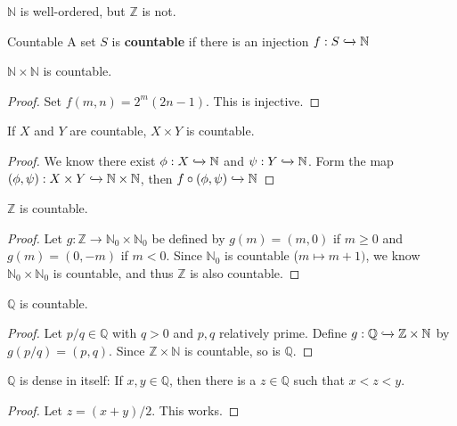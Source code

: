 \documentclass[10pt]{report}
\begin{document}
\begin{ex}{}{}
$\mathbb{N}$ is well-ordered, but $ \mathbb{Z}$ is not.
\end{ex}

\begin{defn}{Countable}{}
	A set $S$ is \textbf{countable} if there is an injection $f : S \xhookrightarrow{} \mathbb{N}$
\end{defn}

\begin{prop}
	$ \mathbb{N} \times \mathbb{N}$ is countable.
\end{prop}
\begin{proof}
	Set $f(m,n) = 2^m (2n-1)$. This is injective.
\end{proof}

\begin{cor}
	If $X$ and $Y$ are countable, $X \times Y$ is countable.
\end{cor}
\begin{proof}
	We know there exist $\phi: X \xhookrightarrow{} \mathbb{N}$ and $\psi: Y  \xhookrightarrow{} \mathbb{N}$. Form the map $(\phi, \psi) : X \times Y \xhookrightarrow{} \mathbb{N} \times \mathbb{N}$, then $f \circ (\phi, \psi)  \xhookrightarrow{} \mathbb{N}$	
\end{proof}

\begin{cor}
	$\mathbb{Z}$ is countable.
\end{cor}
\begin{proof}
	Let $g: \mathbb{Z} \to \mathbb{N}_0 \times \mathbb{N}_0$ be defined by $g(m) = (m,0)$ if $m \geq 0$ and $g(m) = (0, -m)$ if $m < 0$. Since $\mathbb{N}_0$ is countable ($m \mapsto m+1)$, we know $\mathbb{N}_0 \times \mathbb{N}_0$ is countable, and thus $\mathbb{Z}$ is also countable.
\end{proof}

\begin{cor}
	$\mathbb{Q}$ is countable.
\end{cor}
\begin{proof}
	Let $p/q \in \mathbb{Q}$ with $q > 0$ and $p,q$ relatively prime. Define $g : \mathbb{Q} \xhookrightarrow{} \mathbb{Z} \times \mathbb{N}$ by $g(p/q) = (p,q)$. Since $\mathbb{Z} \times \mathbb{N}$ is countable, so is $\mathbb{Q}$.
\end{proof}

\begin{prop}
	$\mathbb{Q}$ is dense in itself: If $x,y \in \mathbb{Q}$, then there is a $z \in \mathbb{Q}$ such that $x < z < y$.
\end{prop}
\begin{proof}
	Let $z = (x+y)/2$. This works.
\end{proof}
\end{document}
